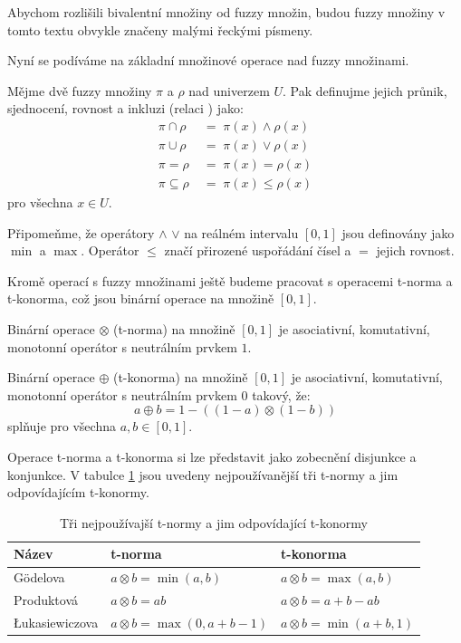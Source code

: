 \documentclass[a4paper,10pt]{article}
\begin{document}
\begin{notation*}
 Abychom rozlišili  bivalentní množiny od fuzzy množin, budou fuzzy množiny v tomto textu obvykle značeny malými řeckými písmeny.
\end{notation*}

Nyní se podíváme na základní množinové operace nad fuzzy množinami.
\begin{definition}
 Mějme dvě fuzzy množiny $\pi$ a $\rho$ nad univerzem $U$. Pak definujme jejich průnik, sjednocení, rovnost a inkluzi (relaci ) jako:
 \begin{align*}
  \pi \cap \rho 	\; &= \; \pi(x) \wedge \rho(x) \\
  \pi \cup \rho 	\; &= \; \pi(x) \vee \rho(x) \\
  \pi = \rho 		\; &= \; \pi(x) = \rho(x) \\
  \pi \subseteq \rho 	\; &= \; \pi(x) \le \rho(x) 
 \end{align*}
 pro všechna $x \in U$.
\end{definition}

Připomeňme, že operátory $\wedge$ $\vee$ na reálném intervalu $[0, 1]$ jsou definovány jako $\min$ a $\max$. Operátor $\le$ značí přirozené uspořádání čísel a $=$ jejich rovnost.

Kromě operací s fuzzy množinami ještě budeme pracovat s operacemi t-norma a t-konorma, což jsou binární operace na množině $[0,1]$.
\begin{definition}
 Binární operace $\otimes$ (t-norma) na množině $[0,1]$ je asociativní, komutativní, monotonní operátor s neutrálním prvkem $1$.
 
 Binární operace $\oplus$  (t-konorma) na množině $[0,1]$ je asociativní, komutativní, monotonní operátor s neutrálním prvkem $0$ takový, že:
 $$
  a \oplus b = 1 - ((1 - a) \otimes (1 - b))
 $$
 splňuje pro všechna $a, b \in [0,1]$.
\end{definition}

Operace t-norma a t-konorma si lze představit jako zobecnění disjunkce a konjunkce. V tabulce \ref{tbl:Norms} jsou uvedeny nejpoužívanější tři t-normy a jim odpovídajícím t-konormy.
\begin{table}
 \centering
 \begin{tabular}{|l||l|l|}
  \hline
  Název 		& t-norma 				& t-konorma				\\\hline
  \hline
  Gödelova 		& $a \otimes b = \min(a, b)$ 		& $a \otimes b = \max(a, b)$		\\\hline
  Produktová 		& $a \otimes b = a b$ 			& $a \otimes b = a + b - a b$		\\\hline
  \L{}ukasiewiczova 	& $a \otimes b = \max(0, a + b - 1)$ 	& $a \otimes b = \min(a + b, 1)$	\\\hline
 \end{tabular}

 \caption{Tři nejpoužívajší t-normy a jim odpovídající t-konormy}
 \label{tbl:Norms}
\end{table}
\end{document}

